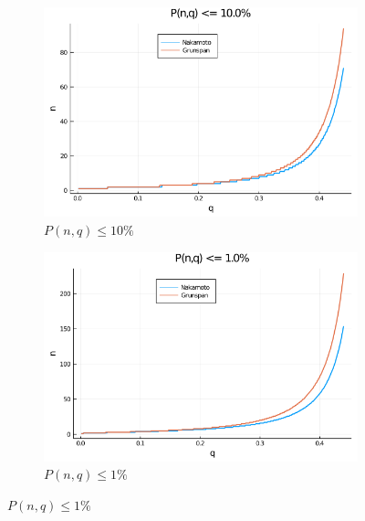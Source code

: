 \documentclass{article}
\begin{document}
        \begin{figure}[H]
            \centering
            \begin{subfigure}{0.65\textwidth}
                \includegraphics[width=\linewidth]{img/limit=0.1.png}
                \caption{$P(n,q) \leq 10\%$}
            \end{subfigure}

            \begin{subfigure}{0.65\textwidth}
                \includegraphics[width=\linewidth]{img/limit=0.01.png}
                \caption{$P(n,q) \leq 1\%$}
            \end{subfigure}


\end{figure}
\end{document}

